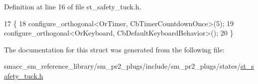 Definition at line 16 of file st\+\_\+safety\+\_\+tuck.\+h.


\begin{DoxyCode}
17     \{
18         configure\_orthogonal<OrTimer,  CbTimerCountdownOnce>(5);    
19         configure\_orthogonal<OrKeyboard, CbDefaultKeyboardBehavior>();
20     \}
\end{DoxyCode}


The documentation for this struct was generated from the following file\+:\begin{DoxyCompactItemize}
\item 
smacc\+\_\+sm\+\_\+reference\+\_\+library/sm\+\_\+pr2\+\_\+plugs/include/sm\+\_\+pr2\+\_\+plugs/states/\hyperlink{st__safety__tuck_8h}{st\+\_\+safety\+\_\+tuck.\+h}\end{DoxyCompactItemize}
